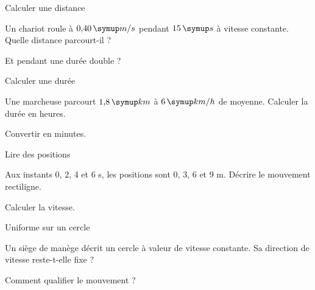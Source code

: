 \par\noindent\begin{minipage}{\linewidth}
\begin{exercice}[2]{Calculer une distance}
\begin{questions}
\item Un chariot roule à $0{,}40\unite{m/s}$ pendant $15\unite s$ à vitesse constante. Quelle distance parcourt-il ?
\item Et pendant une durée double ?
\end{questions}
\end{exercice}
\end{minipage}
\par\noindent\begin{minipage}{\linewidth}
\begin{exercice}[2]{Calculer une durée}
\begin{questions}
\item Une marcheuse parcourt $1{,}8\unite{km}$ à $6\unite{km/h}$ de moyenne. Calculer la durée en heures.
\item Convertir en minutes.
\end{questions}
\end{exercice}
\end{minipage}
\par\noindent\begin{minipage}{\linewidth}
\begin{exercice}[2]{Lire des positions}
\begin{questions}
\item Aux instants 0, 2, 4 et 6 s, les positions sont 0, 3, 6 et 9 m. Décrire le mouvement rectiligne.
\item Calculer la vitesse.
\end{questions}
\end{exercice}
\end{minipage}
\par\noindent\begin{minipage}{\linewidth}
\begin{exercice}[2]{Uniforme sur un cercle}
\begin{questions}
\item Un siège de manège décrit un cercle à valeur de vitesse constante. Sa direction de vitesse reste-t-elle fixe ?
\item Comment qualifier le mouvement ?
\end{questions}
\end{exercice}
\end{minipage}
